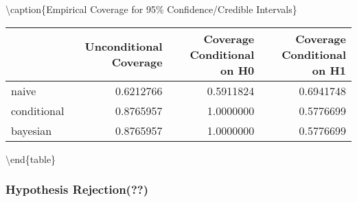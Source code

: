 \documentclass[12pt,twoside]{dukestatscithesis}
\theoremstyle{definition}
\theoremstyle{definition}
\theoremstyle{definition}
\theoremstyle{remark}
\begin{document}
\textbackslash{}caption\{\label{tab:unnamed-chunk-7}Empirical Coverage for
95\% Confidence/Credible Intervals\} \centering
\begin{tabular}[t]{l|r|r|r}
\hline
  & Unconditional Coverage & Coverage Conditional on H0 & Coverage Conditional on H1\\
\hline
naive & 0.6212766 & 0.5911824 & 0.6941748\\
\hline
conditional & 0.8765957 & 1.0000000 & 0.5776699\\
\hline
bayesian & 0.8765957 & 1.0000000 & 0.5776699\\
\hline
\end{tabular}
\textbackslash{}end\{table\}
\begin{Shaded}
\end{Shaded}
\subsubsection{Hypothesis Rejection(??)}\label{hypothesis-rejection}
\end{document}
